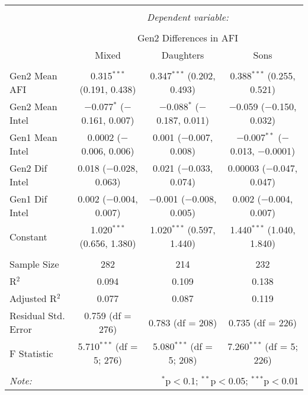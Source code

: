 
\begingroup 
\small 
\begin{tabular}{@{\extracolsep{1pt}}lccc} 
\\[-1.8ex]\hline 
\hline \\[-1.8ex] 
 & \multicolumn{3}{c}{\textit{Dependent variable:}} \\ 
\cline{2-4} 
\\[-1.8ex] & \multicolumn{3}{c}{Gen2 Differences in AFI} \\ 
 & Mixed & Daughters & Sons \\ 
\hline \\[-1.8ex] 
 Gen2 Mean AFI & 0.315$^{***}$ (0.191, 0.438) & 0.347$^{***}$ (0.202, 0.493) & 0.388$^{***}$ (0.255, 0.521) \\ 
  Gen2 Mean Intel & $-$0.077$^{*}$ ($-$0.161, 0.007) & $-$0.088$^{*}$ ($-$0.187, 0.011) & $-$0.059 ($-$0.150, 0.032) \\ 
  Gen1 Mean Intel & 0.0002 ($-$0.006, 0.006) & 0.001 ($-$0.007, 0.008) & $-$0.007$^{**}$ ($-$0.013, $-$0.0001) \\ 
  Gen2 Dif Intel & 0.018 ($-$0.028, 0.063) & 0.021 ($-$0.033, 0.074) & 0.00003 ($-$0.047, 0.047) \\ 
  Gen1 Dif Intel & 0.002 ($-$0.004, 0.007) & $-$0.001 ($-$0.008, 0.005) & 0.002 ($-$0.004, 0.007) \\ 
  Constant & 1.020$^{***}$ (0.656, 1.380) & 1.020$^{***}$ (0.597, 1.440) & 1.440$^{***}$ (1.040, 1.840) \\ 
 \hline \\[-1.8ex] 
Sample Size & 282 & 214 & 232 \\ 
R$^{2}$ & 0.094 & 0.109 & 0.138 \\ 
Adjusted R$^{2}$ & 0.077 & 0.087 & 0.119 \\ 
Residual Std. Error & 0.759 (df = 276) & 0.783 (df = 208) & 0.735 (df = 226) \\ 
F Statistic & 5.710$^{***}$ (df = 5; 276) & 5.080$^{***}$ (df = 5; 208) & 7.260$^{***}$ (df = 5; 226) \\ 
\hline 
\hline \\[-1.8ex] 
\textit{Note:}  & \multicolumn{3}{r}{$^{*}$p$<$0.1; $^{**}$p$<$0.05; $^{***}$p$<$0.01} \\ 
\end{tabular} 
\endgroup 

